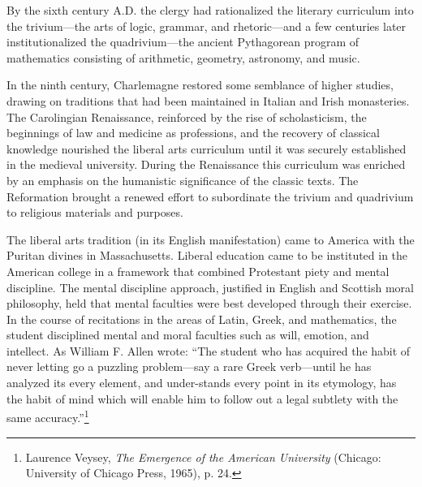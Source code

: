 By the sixth century A.D. the clergy had rationalized the literary curriculum into the trivium---the arts of logic, grammar, and rhetoric---and a few centuries later institutionalized the quadrivium---the ancient Pythagorean program of mathematics consisting of arithmetic, geometry, astronomy, and music.

In the ninth century, Charlemagne restored some semblance of higher studies, drawing on traditions that had been maintained in Italian and Irish monasteries. The Carolingian Renaissance, reinforced by the rise of scholasticism, the beginnings of law and medicine as professions, and the recovery of classical knowledge nourished the liberal arts curriculum until it was securely established in the medieval university. During the Renaissance this curriculum was enriched by an emphasis on the humanistic significance of the classic texts. The Reformation brought a renewed effort to subordinate the trivium and quadrivium to religious materials and purposes. 

The liberal arts tradition (in its English manifestation) came to America with the Puritan divines in Massachusetts. Liberal education came to be instituted in the American college in a framework that combined Protestant piety and mental discipline. The mental discipline approach, justified in English and Scottish moral philosophy, held that mental faculties were best developed through their exercise. In the course of recitations in the areas of Latin, Greek, and mathematics, the student disciplined mental and moral faculties such as will, emotion, and intellect. As William F. Allen wrote: ``The student who has acquired the habit of never letting go a puzzling problem---say a rare Greek verb---until he has analyzed its every element, and under-stands every point in its etymology, has the habit of mind which will enable him to follow out a legal subtlety with the same accuracy.''\footnote{Laurence Veysey, \emph{The Emergence of the American University} (Chicago: University of Chicago Press, 1965), p. 24.}

